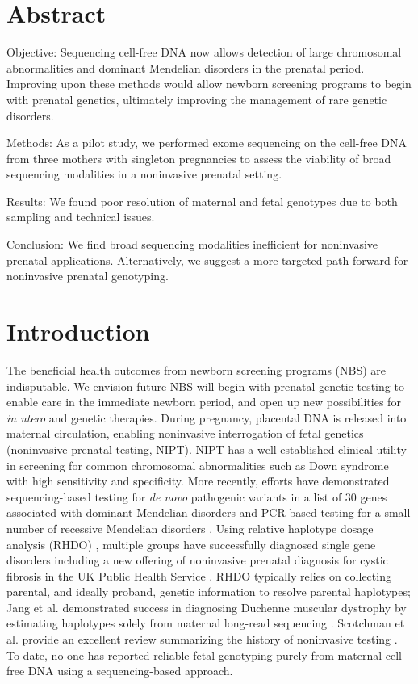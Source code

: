 \documentclass{article}\usepackage[]{graphicx}\usepackage[]{color}
\begin{document}
\section*{Abstract}

Objective: Sequencing cell-free DNA now allows detection of large chromosomal abnormalities and dominant Mendelian disorders in the prenatal period.
Improving upon these methods would allow newborn screening programs to begin with prenatal genetics, ultimately improving the management of rare genetic disorders.

Methods: As a pilot study, we performed exome sequencing on the cell-free DNA from three mothers with singleton pregnancies to assess the viability of broad sequencing modalities in a noninvasive prenatal setting.

Results: We found poor resolution of maternal and fetal genotypes due to both sampling and technical issues.

Conclusion: We find broad sequencing modalities inefficient for noninvasive prenatal applications.
Alternatively, we suggest a more targeted path forward for noninvasive prenatal genotyping.

\section{Introduction}

The beneficial health outcomes from newborn screening programs (NBS) are indisputable.
We envision future NBS will begin with prenatal genetic testing to enable care in the immediate newborn period, and open up new possibilities for \textit{in utero} and genetic therapies.
During pregnancy, placental DNA is released into maternal circulation, enabling noninvasive interrogation of fetal genetics (noninvasive prenatal testing, NIPT).
NIPT has a well-established clinical utility in screening for common chromosomal abnormalities such as Down syndrome with high sensitivity and specificity\cite{mackie:2017aa}.
More recently, efforts have demonstrated sequencing-based testing for \textit{de novo} pathogenic variants in a list of 30 genes associated with dominant Mendelian disorders \cite{zhang:2019aa} and PCR-based testing for a small number of recessive Mendelian disorders \cite{tsao:2019ab}.
Using relative haplotype dosage analysis (RHDO) \cite{lo:2010aa}, multiple groups have successfully diagnosed single gene disorders \cite{hui:2017aa,vermeulen:2017aa,jang:2018aa} including a new offering of noninvasive prenatal diagnosis for cystic fibrosis in the UK Public Health Service \cite{chandler:2020aa}.
RHDO typically relies on collecting parental, and ideally proband, genetic information to resolve parental haplotypes; Jang et al. demonstrated success in diagnosing Duchenne muscular dystrophy by estimating haplotypes solely from maternal long-read sequencing \cite{jang:2018aa}.
Scotchman et al. provide an excellent review summarizing the history of noninvasive testing \cite{scotchman:2020aa}.
To date, no one has reported reliable fetal genotyping purely from maternal cell-free DNA using a sequencing-based approach.
\end{document}
